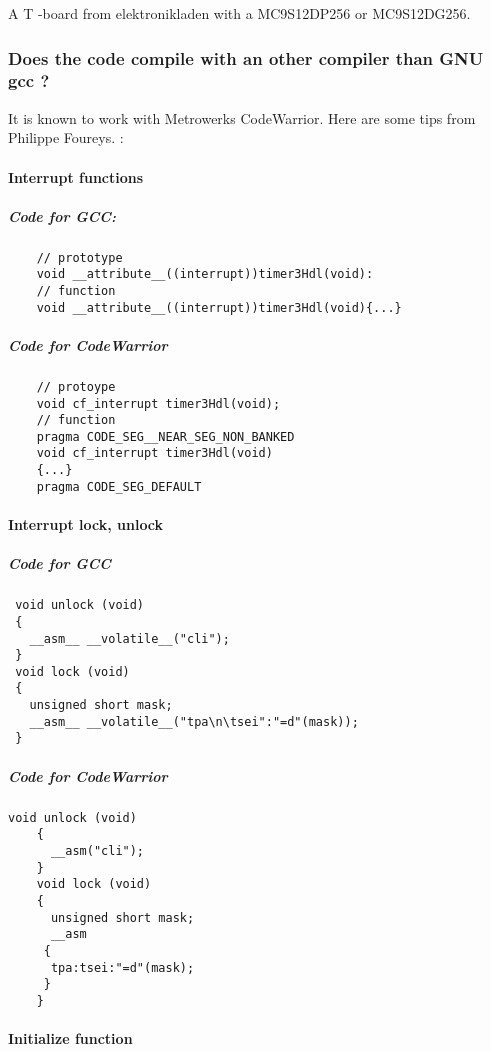 \documentclass[12pt,english,a4paper]{book}
\begin{document}
A T -board from elektronikladen with a MC9S12DP256 or MC9S12DG256.


\subsubsection{Does the code compile with an other compiler than GNU gcc ?}

It is known to work with Metrowerks CodeWarrior. Here are some tips
from Philippe Foureys. :


\paragraph{Interrupt functions}


\subparagraph{Code for GCC:
}


\begin{verbatim}
	// prototype
	void __attribute__((interrupt))timer3Hdl(void):
	// function
	void __attribute__((interrupt))timer3Hdl(void){...}
\end{verbatim}

	
\subparagraph{Code for CodeWarrior
}


\begin{verbatim}
	// protoype
	void cf_interrupt timer3Hdl(void);
	// function
	pragma CODE_SEG__NEAR_SEG_NON_BANKED
	void cf_interrupt timer3Hdl(void)
	{...}
	pragma CODE_SEG_DEFAULT\end{verbatim}


\paragraph{Interrupt lock, unlock
}


\subparagraph{Code for GCC
}


\begin{verbatim}
 void unlock (void)
 {
   __asm__ __volatile__("cli");
 }
 void lock (void)
 {
   unsigned short mask;
   __asm__ __volatile__("tpa\n\tsei":"=d"(mask));
 }
\end{verbatim}


\subparagraph{Code for CodeWarrior}


\begin{verbatim}
void unlock (void)
	{
	  __asm("cli");
	}
	void lock (void)
	{
	  unsigned short mask;
	  __asm
	 {
	  tpa:tsei:"=d"(mask);
	 }
	}
\end{verbatim}


\paragraph{Initialize function}
\end{document}
